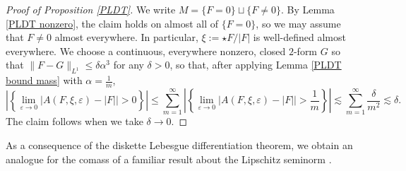 \documentclass[reqno,11pt]{amsart}
\theoremstyle{definition}
\numberwithin{equation}{section}
\begin{document}
\begin{proof}[Proof of Proposition \ref{PLDT}]
We write $M = \{F = 0\} \sqcup \{F \neq 0\}$.
By Lemma \ref{PLDT nonzero}, the claim holds on almost all of $\{F = 0\}$, so we may assume that $F \neq 0$ almost everywhere.
In particular, $\xi := \star F/|F|$ is well-defined almost everywhere.
We choose a continuous, everywhere nonzero, closed $2$-form $G$ so that $\|F - G\|_{L^1} \leq \delta \alpha^3$ for any $\delta > 0$, so that, after applying Lemma \ref{PLDT bound mass} with $\alpha = \frac{1}{m}$,
$$\left|\left\{\lim_{\varepsilon \to 0} |A(F, \xi, \varepsilon) - |F|| > 0\right\}\right| \leq \sum_{m=1}^\infty \left|\left\{\lim_{\varepsilon \to 0} |A(F, \xi, \varepsilon) - |F|| > \frac{1}{m}\right\}\right| \lesssim \sum_{m=1}^\infty \frac{\delta}{m^2} \lesssim \delta.$$
The claim follows when we take $\delta \to 0$.
\end{proof}

As a consequence of the diskette Lebesgue differentiation theorem, we obtain an analogue for the comass of a familiar result about the Lipschitz seminorm \cite[Lemma 4.3]{Crandall2008}.
\end{document}
